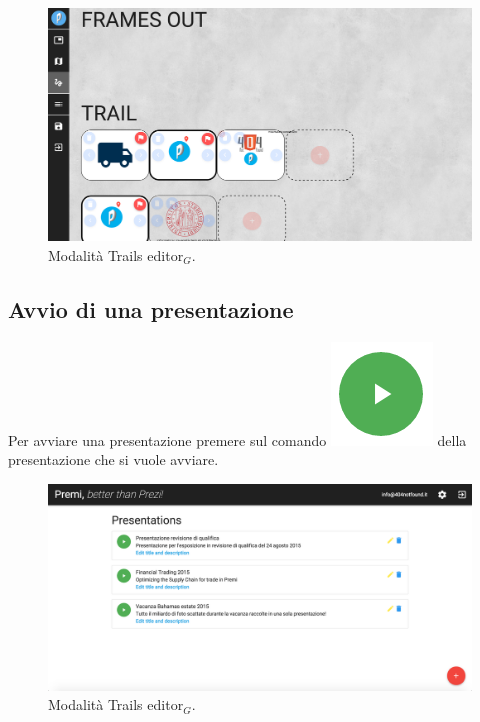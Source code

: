 \begin{figure}[!h]
\begin{center}
\includegraphics[scale=0.35]{img/trail_frame.png}
\caption{Modalità Trails editor$_G$.}
\end{center}
\end{figure}

\newpage
\subsection{Avvio di una presentazione}
Per avviare una presentazione premere sul comando \includegraphics[scale=0.5]{img/play.png} della presentazione che si vuole avviare.\\

\begin{figure}[!h]
\begin{center}
\includegraphics[scale=0.35]{img/dashboard.png}
\caption{Modalità Trails editor$_G$.}
\end{center}
\end{figure}

